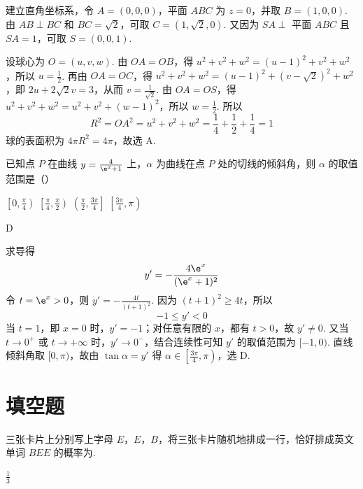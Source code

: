 \begin{solution}
建立直角坐标系，令 \(A=(0,0,0)\)，平面 \(ABC\) 为 \(z=0\)，并取 \(B=(1,0,0)\). 由 \(AB\perp BC\) 和 \(BC=\sqrt{2}\)，可取 \(C=(1,\sqrt{2},0)\). 又因为 \(SA\perp\) 平面 \(ABC\) 且 \(SA=1\)，可取 \(S=(0,0,1)\).

设球心为 \(O=(u,v,w)\). 由 \(OA=OB\)，得
\(u^2+v^2+w^2=(u-1)^2+v^2+w^2\)，所以 \(u=\frac{1}{2}\). 再由 \(OA=OC\)，得
\(u^2+v^2+w^2=(u-1)^2+(v-\sqrt{2})^2+w^2\)，即 \(2u+2\sqrt{2}v=3\)，从而 \(v=\frac{1}{\sqrt{2}}\). 由 \(OA=OS\)，得
\(u^2+v^2+w^2=u^2+v^2+(w-1)^2\)，所以 \(w=\frac{1}{2}\).
所以
\[
R^2=OA^2=u^2+v^2+w^2=\frac14+\frac12+\frac14=1
\]
球的表面积为 \(4\pi R^2=4\pi\)，故选 A.
\end{solution}

\begin{problem}
已知点 \(P\) 在曲线 \(y=\frac{4}{\e^x+1}\) 上，\(\alpha\) 为曲线在点 \(P\) 处的切线的倾斜角，则 \(\alpha\) 的取值范围是（\quad）

\choices
    {\(\left[0,\frac{\pi}{4}\right)\)}
    {\(\left[\frac{\pi}{4},\frac{\pi}{2}\right)\)}
    {\(\left(\frac{\pi}{2},\frac{3\pi}{4}\right]\)}
    {\(\left[\frac{3\pi}{4},\pi\right)\)}
\end{problem}

\begin{answer}
D
\end{answer}

\begin{solution}
求导得
\[
y'=-\frac{4\e^x}{(\e^x+1)^2}
\]
令 \(t=\e^x>0\)，则 \(y'=-\frac{4t}{(t+1)^2}\). 因为 \((t+1)^2\geqslant4t\)，所以
\[
-1\leqslant y'<0
\]
当 \(t=1\)，即 \(x=0\) 时，\(y'=-1\)；对任意有限的 \(x\)，都有 \(t>0\)，故 \(y'\ne0\). 又当 \(t\to0^+\) 或 \(t\to+\infty\) 时，\(y'\to0^-\)，结合连续性可知 \(y'\) 的取值范围为 \([-1,0)\). 直线倾斜角取 \([0,\pi)\)，故由 \(\tan\alpha=y'\) 得
\(\alpha\in\left[\frac{3\pi}{4},\pi\right)\)，选 D.
\end{solution}

\section{填空题}

\begin{problem}
三张卡片上分别写上字母 \(E\)，\(E\)，\(B\)，将三张卡片随机地排成一行，恰好排成英文单词 \(BEE\) 的概率为\fillinblank{}.
\end{problem}

\begin{answer}
\(\frac{1}{3}\)
\end{answer}


